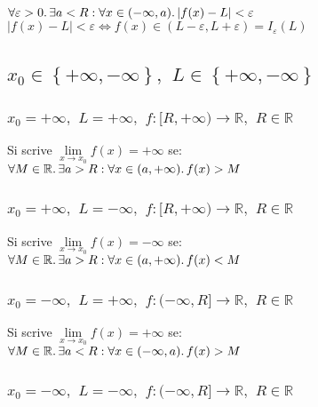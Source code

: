 \documentclass[a4paper, twoside, italian, 11pt]{book}
\newcommand{\braces}[1] {\left \{ #1 \right \}}
\newcommand{\abs}[1] {\left | #1 \right |}
\newcommand{\R}{\mathbb{R}}
\begin{document}
\noindent
$\forall \varepsilon > 0 \ldotp \exists a < R : \forall x \in (-\infty, a) \ldotp \abs{f(x) - L} < \varepsilon$ \\

\noindent
$\abs{f(x) - L} < \varepsilon \iff f(x) \in (L - \varepsilon, L + \varepsilon) = I_\varepsilon(L)$


\subsection{$x_0 \in \braces{+\infty, -\infty},$ $L \in \braces{+\infty, -\infty}$}


\subsubsection{$x_0 = +\infty,$ $L = +\infty,$ $f : [R, +\infty) \rightarrow \R,$ $R \in \R$}

\noindent
Si scrive $\lim\limits_{x \to x_0} f(x) = +\infty$ se: \\

\noindent
$\forall M \in \R \ldotp \exists a > R : \forall x \in (a, +\infty) \ldotp f(x) > M$


\subsubsection{$x_0 = +\infty,$ $L = -\infty,$ $f : [R, +\infty) \rightarrow \R,$ $R \in \R$}

\noindent
Si scrive $\lim\limits_{x \to x_0} f(x) = -\infty$ se: \\

\noindent
$\forall M \in \R \ldotp \exists a > R : \forall x \in (a, +\infty) \ldotp f(x) < M$


\subsubsection{$x_0 = -\infty,$ $L = +\infty,$ $f : (-\infty, R] \rightarrow \R,$ $R \in \R$}

\noindent
Si scrive $\lim\limits_{x \to x_0} f(x) = +\infty$ se: \\

\noindent
$\forall M \in \R \ldotp \exists a < R : \forall x \in (-\infty, a) \ldotp f(x) > M$


\subsubsection{$x_0 = -\infty,$ $L = -\infty,$ $f : (-\infty, R] \rightarrow \R,$ $R \in \R$}
\end{document}

